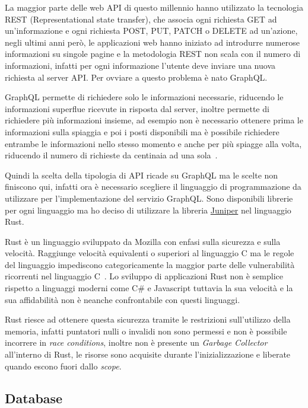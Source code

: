 La maggior parte delle web API di questo millennio hanno utilizzato la tecnologia REST (Representational state transfer), che associa ogni richiesta GET ad un'informazione e ogni richiesta POST, PUT, PATCH o DELETE ad un'azione, negli ultimi anni per\`o, le applicazioni web hanno iniziato ad introdurre numerose informazioni su singole pagine e la metodologia REST non scala con il numero di informazioni, infatti per ogni informazione l'utente deve inviare una nuova richiesta al server API\@. Per ovviare a questo problema \`e nato GraphQL\@.

GraphQL permette di richiedere solo le informazioni necessarie, riducendo le informazioni superflue ricevute in risposta dal server, inoltre permette di richiedere pi\`u informazioni insieme, ad esempio non \`e necessario ottenere prima le informazioni sulla spiaggia e poi i posti disponibili ma \`e possibile richiedere entrambe le informazioni nello stesso momento e anche per pi\`u spiagge alla volta, riducendo il numero di richieste da centinaia ad una sola~\cite{graphql-website}.

Quindi la scelta della tipologia di API ricade su GraphQL ma le scelte non finiscono qui, infatti ora \`e necessario scegliere il linguaggio di programmazione da utilizzare per l'implementazione del servizio GraphQL\@. Sono disponibili librerie per ogni linguaggio ma ho deciso di utilizzare la libreria \href{https://github.com/graphql-rust/juniper}{Juniper} nel linguaggio Rust.

Rust \`e un linguaggio sviluppato da Mozilla con enfasi sulla sicurezza e sulla velocit\`a. Raggiunge velocit\`a equivalenti o superiori al linguaggio C ma le regole del linguaggio impediscono categoricamente la maggior parte delle vulnerabilit\`a ricorrenti nel linguaggio C~\cite{rust-website}. Lo sviluppo di applicazioni Rust non \`e semplice rispetto a linguaggi moderni come C\# e Javascript tuttavia la sua velocit\`a e la sua affidabilit\`a non \`e neanche confrontabile con questi linguaggi.

Rust riesce ad ottenere questa sicurezza tramite le restrizioni sull'utilizzo della memoria, infatti puntatori nulli o invalidi non sono permessi e non \`e possibile incorrere in \emph{race conditions}, inoltre non \`e presente un \emph{Garbage Collector} all'interno di Rust, le risorse sono acquisite durante l'inizializzazione e liberate quando escono fuori dallo \emph{scope}.

\subsection{Database}%
\label{sub:database}

